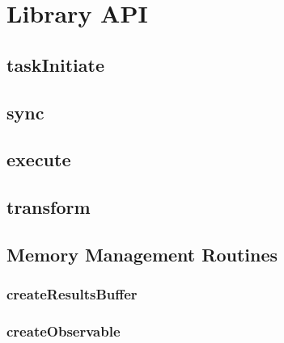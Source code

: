 \documentclass[10pt]{book}
\begin{document}
\section{\qcor Library API}\label{sec:qcor_library_api}
\subsection{\textbf{taskInitiate}}\label{subsec:taskInitiate}


\subsection{\textbf{sync}}\label{subsec:sync}


\subsection{\textbf{execute}}\label{subsec:execute}


\subsection{\textbf{transform}}\label{subsec:transform}


\subsection{Memory Management Routines}
\subsubsection{\textbf{createResultsBuffer}}\label{subsec:createresbuf}


\subsubsection{\textbf{createObservable}}\label{subsec:createobserv}



\clearpage




\end{document}

